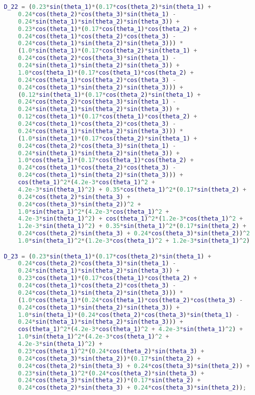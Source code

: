 \begin{anexosenv}
\begin{lstlisting}[language=Matlab]
D_22 = (0.23*sin(theta_1)*(0.17*cos(theta_2)*sin(theta_1) + 
    0.24*cos(theta_2)*cos(theta_3)*sin(theta_1) -
    0.24*sin(theta_1)*sin(theta_2)*sin(theta_3)) + 
    0.23*cos(theta_1)*(0.17*cos(theta_1)*cos(theta_2) +
    0.24*cos(theta_1)*cos(theta_2)*cos(theta_3) - 
    0.24*cos(theta_1)*sin(theta_2)*sin(theta_3))) *
    (1.0*sin(theta_1)*(0.17*cos(theta_2)*sin(theta_1) +
    0.24*cos(theta_2)*cos(theta_3)*sin(theta_1) -
    0.24*sin(theta_1)*sin(theta_2)*sin(theta_3)) +
    1.0*cos(theta_1)*(0.17*cos(theta_1)*cos(theta_2) +
    0.24*cos(theta_1)*cos(theta_2)*cos(theta_3) - 
    0.24*cos(theta_1)*sin(theta_2)*sin(theta_3))) +
    (0.12*sin(theta_1)*(0.17*cos(theta_2)*sin(theta_1) + 
    0.24*cos(theta_2)*cos(theta_3)*sin(theta_1) -
    0.24*sin(theta_1)*sin(theta_2)*sin(theta_3)) + 
    0.12*cos(theta_1)*(0.17*cos(theta_1)*cos(theta_2) +
    0.24*cos(theta_1)*cos(theta_2)*cos(theta_3) - 
    0.24*cos(theta_1)*sin(theta_2)*sin(theta_3))) *
    (1.0*sin(theta_1)*(0.17*cos(theta_2)*sin(theta_1) + 
    0.24*cos(theta_2)*cos(theta_3)*sin(theta_1) -
    0.24*sin(theta_1)*sin(theta_2)*sin(theta_3)) + 
    1.0*cos(theta_1)*(0.17*cos(theta_1)*cos(theta_2) +
    0.24*cos(theta_1)*cos(theta_2)*cos(theta_3) - 
    0.24*cos(theta_1)*sin(theta_2)*sin(theta_3))) +
    cos(theta_1)^2*(4.2e-3*cos(theta_1)^2 + 
    4.2e-3*sin(theta_1)^2) + 0.35*cos(theta_1)^2*(0.17*sin(theta_2) +
    0.24*cos(theta_2)*sin(theta_3) + 
    0.24*cos(theta_3)*sin(theta_2))^2 +
    1.0*sin(theta_1)^2*(4.2e-3*cos(theta_1)^2 + 
    4.2e-3*sin(theta_1)^2) + cos(theta_1)^2*(1.2e-3*cos(theta_1)^2 +
    1.2e-3*sin(theta_1)^2) + 0.35*sin(theta_1)^2*(0.17*sin(theta_2) +
    0.24*cos(theta_2)*sin(theta_3) + 0.24*cos(theta_3)*sin(theta_2))^2 +
    1.0*sin(theta_1)^2*(1.2e-3*cos(theta_1)^2 + 1.2e-3*sin(theta_1)^2);

D_23 = (0.23*sin(theta_1)*(0.17*cos(theta_2)*sin(theta_1) + 
    0.24*cos(theta_2)*cos(theta_3)*sin(theta_1) -
    0.24*sin(theta_1)*sin(theta_2)*sin(theta_3)) + 
    0.23*cos(theta_1)*(0.17*cos(theta_1)*cos(theta_2) +
    0.24*cos(theta_1)*cos(theta_2)*cos(theta_3) - 
    0.24*cos(theta_1)*sin(theta_2)*sin(theta_3))) *
    (1.0*cos(theta_1)*(0.24*cos(theta_1)*cos(theta_2)*cos(theta_3) - 
    0.24*cos(theta_1)*sin(theta_2)*sin(theta_3)) +
    1.0*sin(theta_1)*(0.24*cos(theta_2)*cos(theta_3)*sin(theta_1) - 
    0.24*sin(theta_1)*sin(theta_2)*sin(theta_3))) +
    cos(theta_1)^2*(4.2e-3*cos(theta_1)^2 + 4.2e-3*sin(theta_1)^2) + 
    1.0*sin(theta_1)^2*(4.2e-3*cos(theta_1)^2 +
    4.2e-3*sin(theta_1)^2) +
    0.23*cos(theta_1)^2*(0.24*cos(theta_2)*sin(theta_3) + 
    0.24*cos(theta_3)*sin(theta_2))*(0.17*sin(theta_2) +
    0.24*cos(theta_2)*sin(theta_3) + 0.24*cos(theta_3)*sin(theta_2)) + 
    0.23*sin(theta_1)^2*(0.24*cos(theta_2)*sin(theta_3) +
    0.24*cos(theta_3)*sin(theta_2))*(0.17*sin(theta_2) + 
    0.24*cos(theta_2)*sin(theta_3) + 0.24*cos(theta_3)*sin(theta_2));


\end{lstlisting}
\end{anexosenv}
